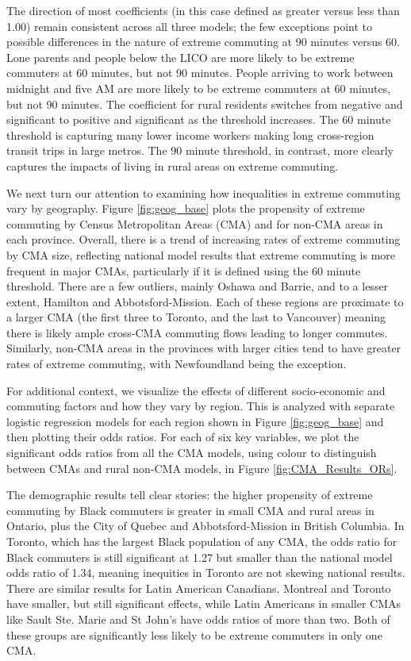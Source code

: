 \documentclass[10 pt,letterpaper]{article}
\begin{document}
The direction of most coefficients (in this case defined as greater versus less than 1.00) remain consistent across all three models; the few exceptions point to possible differences in the nature of extreme commuting at 90 minutes versus 60. Lone parents and people below the LICO are more likely to be extreme commuters at 60 minutes, but not 90 minutes. People arriving to work between midnight and five AM are more likely to be extreme commuters at 60 minutes, but not 90 minutes. The coefficient for rural residents switches from negative and significant to positive and significant as the threshold increases. The 60 minute threshold is capturing many lower income workers making long cross-region transit trips in large metros. The 90 minute threshold, in contrast, more clearly captures the impacts of living in rural areas on extreme commuting.

We next turn our attention to examining how inequalities in extreme commuting vary by geography. Figure \ref{fig:geog_base} plots the propensity of extreme commuting by Census Metropolitan Areas (CMA) and for non-CMA areas in each province. Overall, there is a trend of increasing rates of extreme commuting by CMA size, reflecting national model results that extreme commuting is more frequent in major CMAs, particularly if it is defined using the 60 minute threshold. There are a few outliers, mainly Oshawa and Barrie, and to a lesser extent, Hamilton and Abbotsford-Mission. Each of these regions are proximate to a larger CMA (the first three to Toronto, and the last to Vancouver) meaning there is likely ample cross-CMA commuting flows leading to longer commutes. Similarly, non-CMA areas in the provinces with larger cities tend to have greater rates of extreme commuting, with Newfoundland being the exception. 

For additional context, we visualize the effects of different socio-economic and commuting factors and how they vary by region. This is analyzed with separate logistic regression models for each region shown in Figure \ref{fig:geog_base} and then plotting their odds ratios. For each of six key variables, we plot the significant odds ratios from all the CMA models, using colour to distinguish between CMAs and rural non-CMA models, in Figure \ref{fig:CMA_Results_ORs}.

The demographic results tell clear stories: the higher propensity of extreme commuting by Black commuters is greater in small CMA and rural areas in Ontario, plus the City of Quebec and Abbotsford-Mission in British Columbia. In Toronto, which has the largest Black population of any CMA, the odds ratio for Black commuters is still significant at 1.27 but smaller than the national model odds ratio of 1.34, meaning inequities in Toronto are not skewing national results. There are similar results for Latin American Canadians. Montreal and Toronto have smaller, but still significant effects, while Latin Americans in smaller CMAs like Sault Ste. Marie and St John's have odds ratios of more than two. Both of these groups are significantly less likely to be extreme commuters in only one CMA. 
\end{document}
